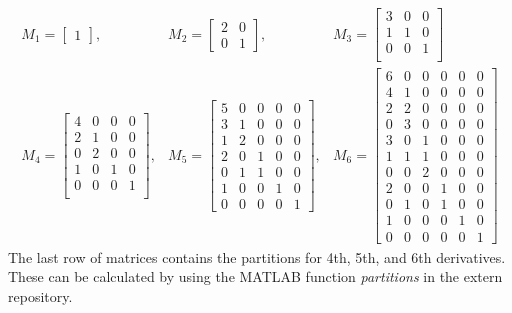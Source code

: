 \documentclass[11pt]{article} %
\begin{document}
\begin{eqnarray}
M_1 = \begin{bmatrix}
1
\end{bmatrix},
&
M_2 = \begin{bmatrix}
2 & 0 \\
0 & 1
\end{bmatrix},
&
M_3 = \begin{bmatrix}
3 & 0 & 0 \\
1 & 1 & 0 \\
0 & 0 & 1 \\
\end{bmatrix} \\
M_4 = \begin{bmatrix}
4 & 0 & 0 & 0 \\
2 & 1 & 0 & 0 \\
0 & 2 & 0 & 0 \\
1 & 0 & 1 & 0 \\
0 & 0 & 0 & 1 \\
\end{bmatrix}, &
M_5 = \begin{bmatrix}
5 & 0 & 0 & 0 & 0\\ 3 & 1 & 0 & 0 & 0\\ 1 & 2 & 0 & 0 & 0\\ 2 & 0 & 1 & 0 & 0\\ 0 & 1 & 1 & 0 & 0\\ 1 & 0 & 0 & 1 & 0\\ 0 & 0 & 0 & 0 & 1
\end{bmatrix}, &
M_6 = \begin{bmatrix}
6 & 0 & 0 & 0 & 0 & 0\\ 4 & 1 & 0 & 0 & 0 & 0\\ 2 & 2 & 0 & 0 & 0 & 0\\ 0 & 3 & 0 & 0 & 0 & 0\\ 3 & 0 & 1 & 0 & 0 & 0\\ 1 & 1 & 1 & 0 & 0 & 0\\ 0 & 0 & 2 & 0 & 0 & 0\\ 2 & 0 & 0 & 1 & 0 & 0\\ 0 & 1 & 0 & 1 & 0 & 0\\ 1 & 0 & 0 & 0 & 1 & 0\\ 0 & 0 & 0 & 0 & 0 & 1
\end{bmatrix}
\end{eqnarray}
The last row of matrices contains the partitions for 4th, 5th, and 6th derivatives. These can be calculated by using the MATLAB function {\em partitions} in the extern repository.
\end{document}
